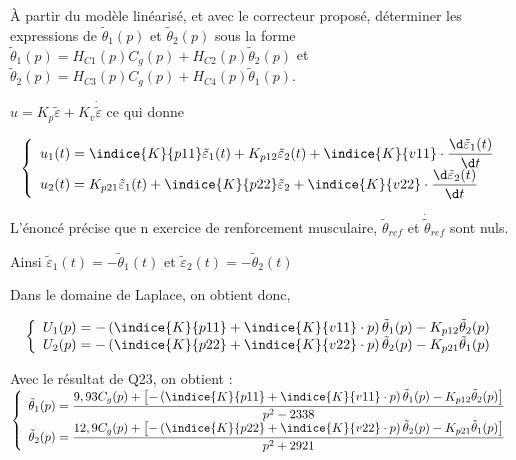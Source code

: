 \begin{question}
\label{2023_ccs_psi_q_26}
 À partir du modèle linéarisé, et avec le correcteur proposé, déterminer les expressions de $\tilde{\theta}_{1}(p)$ et $\tilde{\theta}_{2}(p)$ sous la forme $\tilde{\theta}_{1}(p)=H_{C 1}(p) C_{g}(p)+H_{C 2}(p) \tilde{\theta}_{2}(p)$ et $\tilde{\theta}_{2}(p)=H_{C 3}(p) C_{g}(p)+H_{C 4}(p) \tilde{\theta}_{1}(p)$.\\
\end{question}
\ifprof
\begin{corrige}
$u=K_p\tilde{\varepsilon}+K_v\dot{\tilde{\varepsilon}}$  ce qui donne 

\begin{align*}
\left\{
\begin{array}{l}
u_1(t)=\indice{K}{p11}\tilde{\varepsilon}_1(t)+K_{p12}\tilde{\varepsilon}_2(t)+\indice{K}{v11} \cdot \dfrac{\d \tilde{\varepsilon}_1(t)}{\d t} \\
u_2(t)=K_{p21}\tilde{\varepsilon}_1(t)+\indice{K}{p22}\tilde{\varepsilon}_2+\indice{K}{v22}\cdot \dfrac{\d \tilde{\varepsilon}_2(t)}{\d t}
\end{array}
\right.
\end{align*}

L'énoncé précise que n exercice de renforcement musculaire, $\tilde{\theta}_{ref}$ et $\dot{\tilde{\theta}}_{ref}$ sont nuls.

Ainsi $\tilde{\varepsilon}_1(t)=-\tilde{\theta}_1(t)$ et $\tilde{\varepsilon}_2(t)=-\tilde{\theta}_2(t)$

Dans le domaine de Laplace, on obtient donc,

\begin{align*}
\left\{
\begin{array}{l}
U_1(p)=-\left(\indice{K}{p11}+\indice{K}{v11}\cdot p\right)\tilde{\theta}_1(p)-K_{p12}\tilde{\theta}_2(p)\\
U_2(p)=-\left(\indice{K}{p22}+\indice{K}{v22}\cdot p\right)\tilde{\theta}_2(p)-K_{p21}\tilde{\theta}_1(p)\\
\end{array}
\right.
\end{align*}

Avec le résultat de Q23, on obtient : 
$
\left\{
\begin{array}{l}
\tilde{\theta}_1(p)=\dfrac{9,93C_g(p)+\left[-\left(\indice{K}{p11}+\indice{K}{v11}\cdot p\right)\tilde{\theta}_1(p)-K_{p12}\tilde{\theta}_2(p)\right]}{p^2-2338}\\
\tilde{\theta}_2(p)=\dfrac{12,9C_g(p)+\left[-\left(\indice{K}{p22}+\indice{K}{v22}\cdot p\right)\tilde{\theta}_2(p)-K_{p21}\tilde{\theta}_1(p)\right]}{p^2+2921}\\
\end{array}
\right.
$


\end{corrige}

